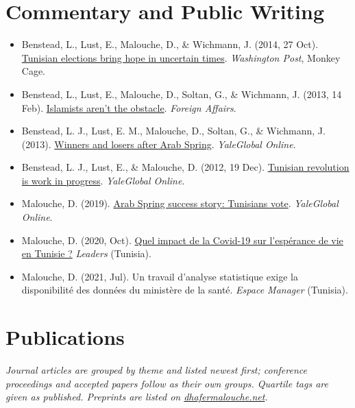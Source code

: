 \documentclass[10pt,a4paper]{article}
\begin{document}
\section{Commentary and Public Writing}
\begin{itemize}
\item Benstead, L., Lust, E., Malouche, D., \& Wichmann, J. (2014, 27 Oct).
      \href{https://www.washingtonpost.com/news/monkey-cage/wp/2014/10/27/tunisian-elections-bring-hope-in-uncertain-times/}{Tunisian elections bring hope in uncertain times}. \emph{Washington Post}, Monkey Cage.
\item Benstead, L., Lust, E., Malouche, D., Soltan, G., \& Wichmann, J. (2013, 14 Feb).
      \href{https://www.foreignaffairs.com/tunisia/islamists-arent-obstacle}{Islamists aren't the obstacle}. \emph{Foreign Affairs}.
\item Benstead, L. J., Lust, E. M., Malouche, D., Soltan, G., \& Wichmann, J. (2013).
      \href{https://archive-yaleglobal.yale.edu/content/winners-and-losers-after-arab-spring}{Winners and losers after Arab Spring}. \emph{YaleGlobal Online}.
\item Benstead, L. J., Lust, E., \& Malouche, D. (2012, 19 Dec).
      \href{https://archive-yaleglobal.yale.edu/content/tunisian-revolution-work-progress}{Tunisian revolution is work in progress}. \emph{YaleGlobal Online}.
\item Malouche, D. (2019). \href{https://archive-yaleglobal.yale.edu/content/arab-spring-success-story-tunisians-vote}{Arab Spring success story: Tunisians vote}. \emph{YaleGlobal Online}.
\item Malouche, D. (2020, Oct). \href{https://leaders.com.tn/article/30775-dhafer-malouche-quel-impact-de-la-covid-19-sur-l-esperance-de-vie-en-tunisie}{Quel impact de la Covid-19 sur l'esp\'erance de vie en Tunisie ?} \emph{Leaders} (Tunisia).
\item Malouche, D. (2021, Jul). Un travail d'analyse statistique exige la disponibilit\'e des donn\'ees du minist\`ere de la sant\'e. \emph{Espace Manager} (Tunisia).
\end{itemize}

\section{Publications}
\textit{Journal articles are grouped by theme and listed newest first; conference proceedings and accepted papers
follow as their own groups. Quartile tags are given as published. Preprints are listed on
\href{https://dhafermalouche.net}{dhafermalouche.net}.}
\end{document}
